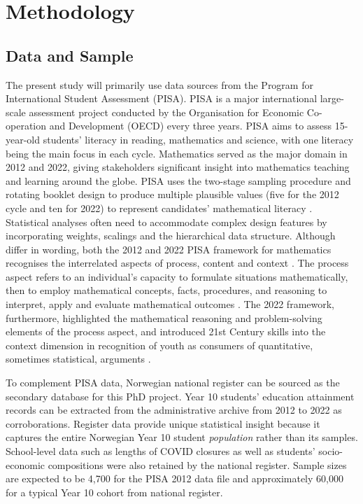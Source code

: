\documentclass[
    a4paper,                %
    11pt,                   %
    stu,                    %
    donotrepeattitle,       %
    floatsintext,           %
    biblatex,               %
    colorlinks=true,        %
    linkcolor=red,          %
    anchorcolor=black,      %
    citecolor=blue,         %
    urlcolor=blue,          %
    bookmarks=true,         %
    bookmarksopen=false,    %
    bookmarksnumbered=true, %
    dvipsnames              %
]{apa7}
\begin{document}
\section{Methodology}

\subsection{Data and Sample}

The present study will primarily use data sources from the Program for International Student Assessment (PISA). PISA is a major international large-scale assessment project conducted by the Organisation for Economic Co-operation and Development (OECD) every three years. PISA aims to assess 15-year-old students' literacy in reading, mathematics and science, with one literacy being the main focus in each cycle. Mathematics served as the major domain in 2012 and 2022, giving stakeholders significant insight into mathematics teaching and learning around the globe. PISA uses the two-stage sampling procedure and rotating booklet design to produce multiple plausible values (five for the 2012 cycle and ten for 2022) to represent candidates' mathematical literacy \parencite{rust:2014}. Statistical analyses often need to accommodate complex design features by incorporating weights, scalings and the hierarchical data structure. Although differ in wording, both the 2012 and 2022 PISA framework for mathematics recognises the interrelated aspects of process, content and context \parencite{oecd:2013}. The process aspect refers to an individual's capacity to formulate situations mathematically, then to employ mathematical concepts, facts, procedures, and reasoning to interpret, apply and evaluate mathematical outcomes \parencite[][p. 28]{oecd:2013}. The 2022 framework, furthermore, highlighted the mathematical reasoning and problem-solving elements of the process aspect, and introduced 21st Century skills into the context dimension in recognition of youth as consumers of quantitative, sometimes statistical, arguments \parencite{oecd:2018}.

To complement PISA data, Norwegian national register can be sourced as the secondary database for this PhD project. Year 10 students' education attainment records can be extracted from the administrative archive from 2012 to 2022 as corroborations. Register data provide unique statistical insight because it captures the entire Norwegian Year 10 student \emph{population} rather than its samples. School-level data such as lengths of COVID closures as well as students' socio-economic compositions were also retained by the national register. Sample sizes are expected to be 4,700 for the PISA 2012 data file \parencite{oecd:2014} and approximately 60,000 for a typical Year 10 cohort from national register.
\end{document}
